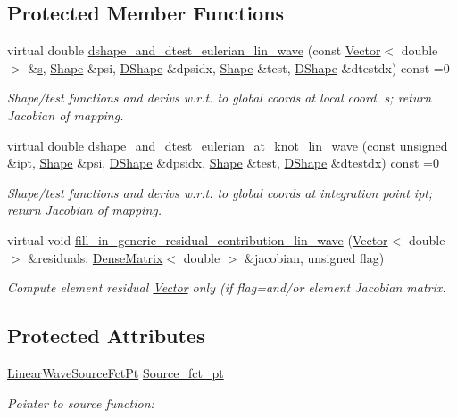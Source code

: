 \subsection*{Protected Member Functions}
\begin{DoxyCompactItemize}
\item 
virtual double \hyperlink{classoomph_1_1LinearWaveEquations_a57ed864bd1ecad66fc115bf3b956e4c6}{dshape\+\_\+and\+\_\+dtest\+\_\+eulerian\+\_\+lin\+\_\+wave} (const \hyperlink{classoomph_1_1Vector}{Vector}$<$ double $>$ \&\hyperlink{cfortran_8h_ab7123126e4885ef647dd9c6e3807a21c}{s}, \hyperlink{classoomph_1_1Shape}{Shape} \&psi, \hyperlink{classoomph_1_1DShape}{D\+Shape} \&dpsidx, \hyperlink{classoomph_1_1Shape}{Shape} \&test, \hyperlink{classoomph_1_1DShape}{D\+Shape} \&dtestdx) const =0
\begin{DoxyCompactList}\small\item\em Shape/test functions and derivs w.\+r.\+t. to global coords at local coord. s; return Jacobian of mapping. \end{DoxyCompactList}\item 
virtual double \hyperlink{classoomph_1_1LinearWaveEquations_a8033ffc13e61d7adcd4b7e1154ea12af}{dshape\+\_\+and\+\_\+dtest\+\_\+eulerian\+\_\+at\+\_\+knot\+\_\+lin\+\_\+wave} (const unsigned \&ipt, \hyperlink{classoomph_1_1Shape}{Shape} \&psi, \hyperlink{classoomph_1_1DShape}{D\+Shape} \&dpsidx, \hyperlink{classoomph_1_1Shape}{Shape} \&test, \hyperlink{classoomph_1_1DShape}{D\+Shape} \&dtestdx) const =0
\begin{DoxyCompactList}\small\item\em Shape/test functions and derivs w.\+r.\+t. to global coords at integration point ipt; return Jacobian of mapping. \end{DoxyCompactList}\item 
virtual void \hyperlink{classoomph_1_1LinearWaveEquations_ae6017a229d5eccb3fb342e34a10382ec}{fill\+\_\+in\+\_\+generic\+\_\+residual\+\_\+contribution\+\_\+lin\+\_\+wave} (\hyperlink{classoomph_1_1Vector}{Vector}$<$ double $>$ \&residuals, \hyperlink{classoomph_1_1DenseMatrix}{Dense\+Matrix}$<$ double $>$ \&jacobian, unsigned flag)
\begin{DoxyCompactList}\small\item\em Compute element residual \hyperlink{classoomph_1_1Vector}{Vector} only (if flag=and/or element Jacobian matrix. \end{DoxyCompactList}\end{DoxyCompactItemize}
\subsection*{Protected Attributes}
\begin{DoxyCompactItemize}
\item 
\hyperlink{classoomph_1_1LinearWaveEquations_a9648dd63c18bab6854d362d16f01e33d}{Linear\+Wave\+Source\+Fct\+Pt} \hyperlink{classoomph_1_1LinearWaveEquations_abdbae7c7594a53c7d5d5e73c13ea7cb2}{Source\+\_\+fct\+\_\+pt}
\begin{DoxyCompactList}\small\item\em Pointer to source function\+: \end{DoxyCompactList}\end{DoxyCompactItemize}
